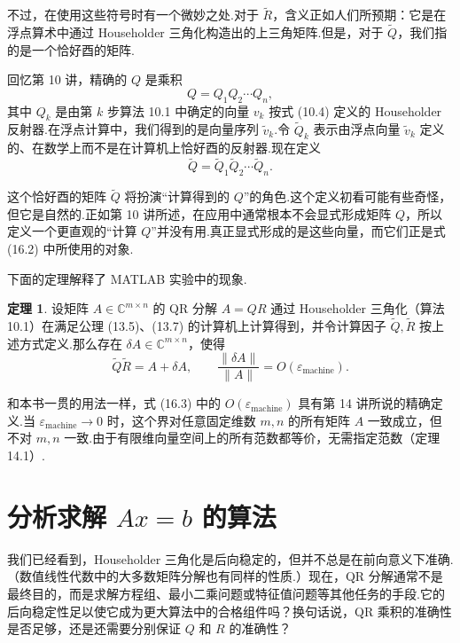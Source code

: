 \documentclass[UTF8,fontset=none,12pt]{ctexart}
\newcommand{\C}{\mathbb{C}}
\newcommand{\epsmach}{\varepsilon_{\mathrm{machine}}}
\theoremstyle{definition}
\newtheorem{theorem}{定理}
\begin{document}
不过，在使用这些符号时有一个微妙之处.对于 $\widetilde R$，含义正如人们所预期：它是在浮点算术中通过 Householder 三角化构造出的上三角矩阵.但是，对于 $\widetilde Q$，我们指的是一个恰好酉的矩阵.

回忆第 10 讲，精确的 $Q$ 是乘积
\[
    Q=Q_1Q_2\cdots Q_n,
\]
其中 $Q_k$ 是由第 $k$ 步算法 10.1 中确定的向量 $v_k$ 按式 (10.4) 定义的 Householder 反射器.在浮点计算中，我们得到的是向量序列 $\widetilde v_k$.令 $\widetilde Q_k$ 表示由浮点向量 $\widetilde v_k$ 定义的、在数学上而不是在计算机上恰好酉的反射器.现在定义
\begin{equation}
    \widetilde Q=\widetilde Q_1\widetilde Q_2\cdots\widetilde Q_n.
    \tag{16.2}
\end{equation}

这个恰好酉的矩阵 $\widetilde Q$ 将扮演“计算得到的 $Q$”的角色.这个定义初看可能有些奇怪，但它是自然的.正如第 10 讲所述，在应用中通常根本不会显式形成矩阵 $Q$，所以定义一个更直观的“计算 $Q$”并没有用.真正显式形成的是这些向量，而它们正是式 (16.2) 中所使用的对象.

下面的定理解释了 MATLAB 实验中的现象.

\begin{theorem}
设矩阵 $A\in\C^{m\times n}$ 的 QR 分解 $A=QR$ 通过 Householder 三角化（算法 10.1）在满足公理 (13.5)、(13.7) 的计算机上计算得到，并令计算因子 $\widetilde Q,\widetilde R$ 按上述方式定义.那么存在 $\delta A\in\C^{m\times n}$，使得
\begin{equation}
    \widetilde Q\widetilde R=A+\delta A,
    \qquad
    \frac{\|\delta A\|}{\|A\|}
    =O(\epsmach).
    \tag{16.3}
\end{equation}
\end{theorem}

和本书一贯的用法一样，式 (16.3) 中的 $O(\epsmach)$ 具有第 14 讲所说的精确定义.当 $\epsmach\to0$ 时，这个界对任意固定维数 $m,n$ 的所有矩阵 $A$ 一致成立，但不对 $m,n$ 一致.由于有限维向量空间上的所有范数都等价，无需指定范数（定理 14.1）.

\section*{分析求解 $Ax=b$ 的算法}

我们已经看到，Householder 三角化是后向稳定的，但并不总是在前向意义下准确.（数值线性代数中的大多数矩阵分解也有同样的性质.）现在，QR 分解通常不是最终目的，而是求解方程组、最小二乘问题或特征值问题等其他任务的手段.它的后向稳定性足以使它成为更大算法中的合格组件吗？换句话说，QR 乘积的准确性是否足够，还是还需要分别保证 $Q$ 和 $R$ 的准确性？
\end{document}
